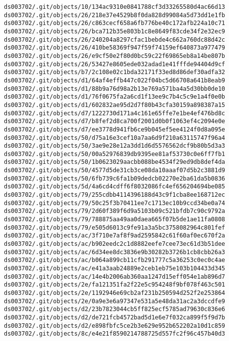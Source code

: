 \documentclass[11pt]{article}
\begin{document}
\begin{Verbatim}[commandchars=\\\{\}]
ds003702/.git/objects/10/134ac9310e0841788cf3d33265580d4ac66d13
ds003702/.git/objects/26/218e37e4529b8f0da828d99084a5d73dd1e1fb
ds003702/.git/objects/26/c863cecf658a6fb776be40c172afb224a10c71
ds003702/.git/objects/26/bca712b35e803b1c8e8649f83cde34f2e32ec9
ds003702/.git/objects/26/240204a8297cfac1bebde4c662a760dc88d42c
ds003702/.git/objects/26/410be58369f947f59f74159ef640873a977479
ds003702/.git/objects/26/e9cf50e2f80d0bc59c22f69865eb8a14be807b
ds003702/.git/objects/26/53427e8605ede032adad1e41fffde94404d9cf
ds003702/.git/objects/b7/2c108e02c1bda32171f33ed8d86def30adfa32
ds003702/.git/objects/d1/64af4effb447c022f04bc5d66708a641b8eab9
ds003702/.git/objects/d1/88b9a76d98a2b13e769a571ba4a5d30bb0de10
ds003702/.git/objects/d1/76f0675fa2a6cd1f13ee9c7b4c5c9e1a4f0e0b
ds003702/.git/objects/d1/602832ae95d2d7f80b43cfa30159a898387a15
ds003702/.git/objects/d7/1222730d171a4c161e65ffe7e1be4ef476bd8c
ds003702/.git/objects/d7/b8fef2d8ca700f2001d0b0f1063ef4c2094e0e
ds003702/.git/objects/d7/ee3778d941fb6ce9b045ef5ee4124f0d8a095e
ds003702/.git/objects/50/d75a16e3cef10a7aa6d9f210a63115747f96a4
ds003702/.git/objects/50/3ae9e28e12a3dd1d6d5576562dcf9b80b5d3a3
ds003702/.git/objects/50/00a52976839db9395ee81af53730c0e6ff7fb1
ds003702/.git/objects/50/1b0623029aacbb088be4534f29ed9db8def4da
ds003702/.git/objects/50/4577d5de31cb3ce08da10aaaf07d5b2c3881d9
ds003702/.git/objects/50/6fb739c6fa1b09dedcb02270e2ba61da5b0836
ds003702/.git/objects/5d/4a6cd4cdff6f8032086fc4ef656204694be085
ds003702/.git/objects/79/255cdbb4114396188d43c9f1cba8ee168712ec
ds003702/.git/objects/79/50c25f3b70411ee7c1713ec10b9ccd34be0a74
ds003702/.git/objects/79/2d60f389f6d9a5103b09c521bfdb7c90c9792a
ds003702/.git/objects/79/788875aa49aa0daea665f07b5de1ae11fa0808
ds003702/.git/objects/79/e505d6013c9fe91a3a5bc3758082964c801fef
ds003702/.git/objects/ac/3f710e7af8f9ad2595842c61f60af0ec670f2a
ds003702/.git/objects/ac/b902eedc2c1d8882eefe7cee73ec61d3b51dee
ds003702/.git/objects/ac/6d34ee8dc3836e9b30282b3726b1cb8cbb26a3
ds003702/.git/objects/ac/b064a899cb11cfb291777c5a36253c0ec0c4ae
ds003702/.git/objects/ac/e41a3aab24889e2ceb1eb75e103b104433d345
ds003702/.git/objects/ac/14e4b2006ab360aa1247d15eff054e1ab896d7
ds003702/.git/objects/2e/fa121351fa2f22e5c954248f9bf078f463c501
ds003702/.git/objects/2e/1192946e69cb2af231b250594d252f2e253864
ds003702/.git/objects/2e/0a9e3e6a97347e531a5e48da31ac2a3dccdfe9
ds003702/.git/objects/d2/23b7823044cb5ff825ecf5785ad79630c836e6
ds003702/.git/objects/d2/de721fcb4572bad5d1e6e7f032ca899f5f9d7b
ds003702/.git/objects/d2/e898fbfc5ce2b3e629e952b652202a10d1c859
ds003702/.git/objects/8c/e4e21f8590214788725d557fc2f96c457b40d3

\end{Verbatim}
\end{document}

